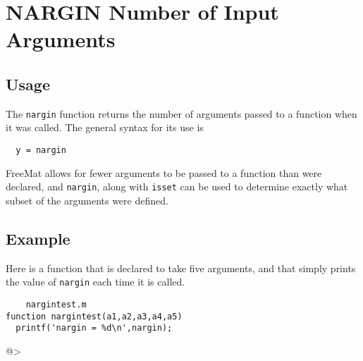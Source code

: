 \section{NARGIN Number of Input Arguments}

\subsection{Usage}

The \verb|nargin| function returns the number of arguments passed
to a function when it was called.  The general syntax for its
use is
\begin{verbatim}
  y = nargin
\end{verbatim}
FreeMat allows for
fewer arguments to be passed to a function than were declared,
and \verb|nargin|, along with \verb|isset| can be used to determine
exactly what subset of the arguments were defined.
\subsection{Example}

Here is a function that is declared to take five 
arguments, and that simply prints the value of \verb|nargin|
each time it is called.
\begin{verbatim}
    nargintest.m
function nargintest(a1,a2,a3,a4,a5)
  printf('nargin = %d\n',nargin);
\end{verbatim}
@>

